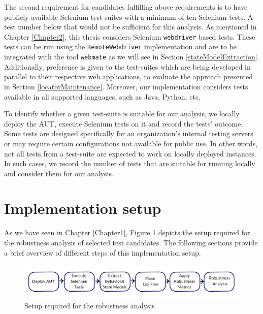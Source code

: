 The second requirement for candidates fulfilling above requirements is to have publicly available Selenium test-suites with a minimum of ten Selenium tests. A test number below that would not be sufficient for this analysis. As mentioned in Chapter \ref{Chapter2}, this thesis considers Selenium \texttt{webdriver} based tests. These tests can be run using the \texttt{RemoteWebdriver} implementation and are to be integrated with the tool \texttt{webmate} as we will see in Section \ref{stateModelExtraction}. Additionally, preference is given to the test-suites which are being developed in parallel to their respective web applications, to evaluate the approach presented in Section \ref{locatorMaintenance}. Moreover, our implementation considers tests available in all supported languages, such as Java, Python, etc. 

To identify whether a given test-suite is suitable for our analysis, we locally deploy the AUT, execute Selenium tests on it and record the tests' outcome. Some tests are designed specifically for an organization's internal testing servers or may require certain configurations not available for public use. In other words, not all tests from a test-suite are expected to work on locally deployed instances. In such cases, we record the number of tests that are suitable for running locally and consider them for our analysis. 


\section{Implementation setup}
\label{implementationsetup}
As we have seen in Chapter \ref{Chapter1}, Figure \ref{fig:thesisoverview2} depicts the setup required for the robustness analysis of selected test candidates. The following sections provide a brief overview of different steps of this implementation setup.  
\begin{figure}[h]
	\centering	\includegraphics[width=\textwidth]{./Figures/thesisoverviewsmall.jpg}
	\caption{Setup required for the robustness analysis}
	\label{fig:thesisoverview2}
\end{figure} 

